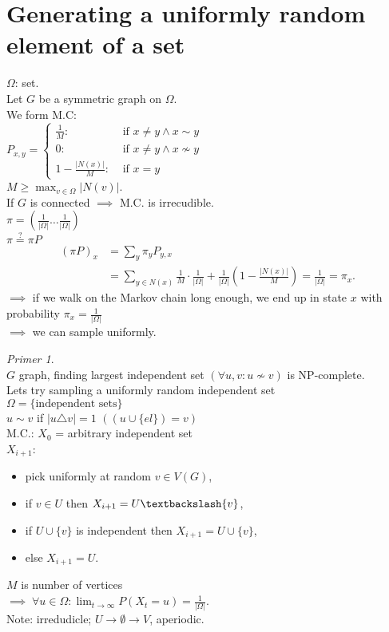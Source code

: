 \documentclass[a4paper, 12pt]{book}
\theoremstyle{definition}
\theoremstyle{remark}
\newtheorem*{ex}{Primer}
\begin{document}
\section{Generating a uniformly random element of a set}

$\Omega$: set. \\
Let $G$ be a symmetric graph on $\Omega$. \\
We form M.C: \\
$P_{x,y} = \begin{cases}
  \frac{1}{M}: &\text{ if } x \neq y \land x \sim y \\
  0: &\text{ if } x \neq y \land x \nsim y \\
  1 - \frac{|N(x)|}{M}: &\text{ if } x = y
\end{cases}$ \\
$M \geq \max_{v \in \Omega} |N(v)|$. \\
If $G$ is connected $\implies$ M.C. is irrecudible. \\
$\pi = (\frac{1}{|\Omega|} \dots \frac{1}{|\Omega|})$ \\
$\pi \stackrel{?}{=} \pi P$ \\
\begin{align*}
  (\pi P)_x &= \sum_y \pi_y P_{y,x} \\
  &= \sum_{y \in N(x)} \frac{1}{M} \cdot \frac{1}{|\Omega|} + \frac{1}{|\Omega|}
    \left(1 - \frac{|N(x)|}{M}\right) = \frac{1}{|\Omega|} = \pi_x.
\end{align*}
$\implies$ if we walk on the Markov chain long enough, we end up in state $x$ with probability $\pi_x = \frac{1}{|\Omega|}$ \\
$\implies$ we can sample uniformly.
\begin{ex} \text{} \\
  $G$ graph, finding largest independent set $(\forall u,v: u \nsim v)$ is NP-complete. \\
  Lets try sampling a uniformly random independent set \\
  $\Omega = \{\text{independent sets}\}$ \\
  $u \sim v$ if $|u \triangle v| = 1$ $((u \cup \{el\}) = v)$ \\
  M.C.: $X_0$ = arbitrary independent set \\
  $X_{i+1}$:
  \begin{itemize}
    \item pick uniformly at random $v \in V(G)$,
    \item if $v \in U$ then $X_{i+1} = U \textbackslash \{v\}$,
    \item if $U \cup \{v\}$ is independent then $X_{i+1} = U \cup \{v\}$,
    \item else $X_{i+1} = U$.
  \end{itemize}
  $M$ is number of vertices \\
  $\implies \; \forall u \in \Omega: \lim_{t \to \infty} P(X_t = u) = \frac{1}{|\Omega|}$. \\
  Note: irredudicle; $U \to \emptyset \to V$, aperiodic.
\end{ex}
\end{document}
